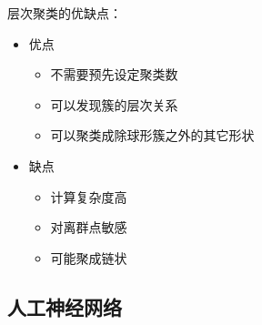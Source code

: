 \begin{note}
    层次聚类的优缺点：
    \begin{itemize}
        \item 优点
        \begin{itemize}
            \item 不需要预先设定聚类数
            \item 可以发现簇的层次关系
            \item 可以聚类成除球形簇之外的其它形状
        \end{itemize}
        \item 缺点
        \begin{itemize}
            \item 计算复杂度高
            \item 对离群点敏感
            \item 可能聚成链状
        \end{itemize}
    \end{itemize}
\end{note}
\subsection{人工神经网络}
